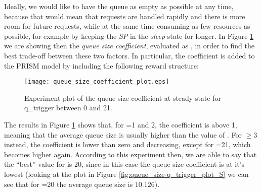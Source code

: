 {      Ideally, we would like to have the queue as empty as possible at any time, because that would mean that requests are handled rapidly and there is more room for future requests, while at the same time consuming as few resources as possible, for example by keeping the \textit{SP} in the \textit{sleep} state for longer. In Figure \ref{fig:queue_size_coefficient_plot} we are showing then the \textit{queue size coefficient}, evaluated as , in order to find the best trade-off between these two factors. In particular, the coefficient is added to the PRISM model by including the following reward structure:
      
      
      
    	\begin{figure}[h!]
    		\begin{center}
    			\texttt{[image: queue\_size\_coefficient\_plot.eps]}
    		\end{center}
    		\caption{Experiment plot of the queue size coefficient at steady-state for q\_trigger between 0 and 21.}
    		\label{fig:queue_size_coefficient_plot}
    	\end{figure}
      
      The results in Figure \ref{fig:queue_size_coefficient_plot} shows that, for =1 and 2, the coefficient is above 1, meaning that the average queue size is usually higher than the value of . For $\geq 3$ instead, the coefficient is lower than zero and decreasing, except for =21, which becomes higher again. According to this experiment then, we are able to say that the ``best'' value for  is $20$, since in this case the queue size coefficient is at it's lowest (looking at the plot in Figure \ref{fig:queue_size-q_trigger_plot_S} we can see that for =20 the average queue size is $10.126$).
    }
    
    
